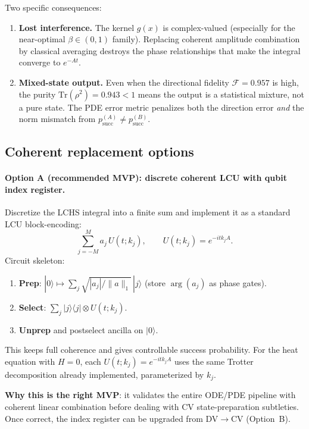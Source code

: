 \documentclass[11pt]{article}
\begin{document}
Two specific consequences:
\begin{enumerate}[itemsep=2pt,topsep=2pt]
\item \textbf{Lost interference.}
The kernel $g(x)$ is complex-valued (especially for the near-optimal $\beta\in(0,1)$ family).
Replacing coherent amplitude combination by classical averaging destroys the phase relationships
that make the integral converge to $e^{-At}$.
\item \textbf{Mixed-state output.}
Even when the directional fidelity $\mathcal{F}=0.957$ is high, the purity
$\mathrm{Tr}(\rho^2)=0.943<1$ means the output is a statistical mixture, not a pure state.
The PDE error metric penalizes both the direction error \emph{and} the norm mismatch
from $p_{\mathrm{succ}}^{(A)} \neq p_{\mathrm{succ}}^{(B)}$.
\end{enumerate}

\subsection{Coherent replacement options}
\label{sec:coherent_options}

\paragraph{Option A (recommended MVP): discrete coherent LCU with qubit index register.}

Discretize the LCHS integral into a finite sum and implement it as a standard LCU block-encoding:
\[
\sum_{j=-M}^{M} a_j\, U(t; k_j), \qquad U(t;k_j) = e^{-it k_j A}.
\]
Circuit skeleton:
\begin{enumerate}[itemsep=2pt,topsep=2pt]
\item \textbf{Prep}: $|0\rangle \mapsto \sum_j \sqrt{|a_j|/\|a\|_1}\,|j\rangle$
      (store $\arg(a_j)$ as phase gates).
\item \textbf{Select}: $\sum_j |j\rangle\!\langle j| \otimes U(t;k_j)$.
\item \textbf{Unprep} and postselect ancilla on $|0\rangle$.
\end{enumerate}
This keeps full coherence and gives controllable success probability.
For the heat equation with $H=0$, each $U(t;k_j) = e^{-itk_j A}$ uses the same
Trotter decomposition already implemented, parameterized by $k_j$.

\textbf{Why this is the right MVP}: it validates the entire ODE/PDE pipeline
with coherent linear combination before dealing with CV state-preparation subtleties.
Once correct, the index register can be upgraded from DV$\to$CV (Option~B).
\end{document}
